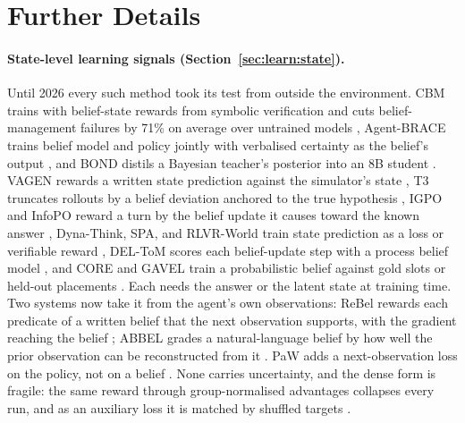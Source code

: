 \section{Further Details}
\label{app:details}

\paragraph{State-level learning signals (Section~\ref{sec:learn:state}).}
Until 2026 every such method took its test from outside the environment. CBM trains with belief-state rewards from symbolic verification and cuts belief-management failures by 71\% on average over untrained models \citep{xu2026should}, Agent-BRACE trains belief model and policy jointly with verbalised certainty as the belief's output \citep{singh2026agent}, and BOND distils a Bayesian teacher's posterior into an 8B student \citep{cui2026distilling}. VAGEN rewards a written state prediction against the simulator's state \citep{wang2025vagen}, T3 truncates rollouts by a belief deviation anchored to the true hypothesis \citep{zou2025t3}, IGPO and InfoPO reward a turn by the belief update it causes toward the known answer \citep{wang2025information,kong2026infopo}, Dyna-Think, SPA, and RLVR-World train state prediction as a loss or verifiable reward \citep{yu2025dynathink,chen2025why,wu2025rlvrworld}, DEL-ToM scores each belief-update step with a process belief model \citep{wu2025deltom}, and CORE and GAVEL train a probabilistic belief against gold slots or held-out placements \citep{zhang2026toward,wang2026gavel}. Each needs the answer or the latent state at training time. Two systems now take it from the agent's own observations: ReBel rewards each predicate of a written belief that the next observation supports, with the gradient reaching the belief \citep{tang2026rewarding}; ABBEL grades a natural-language belief by how well the prior observation can be reconstructed from it \citep{lidayan2025abbel}. PaW adds a next-observation loss on the policy, not on a belief \citep{lu2026policy}. None carries uncertainty, and the dense form is fragile: the same reward through group-normalised advantages collapses every run, and as an auxiliary loss it is matched by shuffled targets \citep{wang2026dark}.

